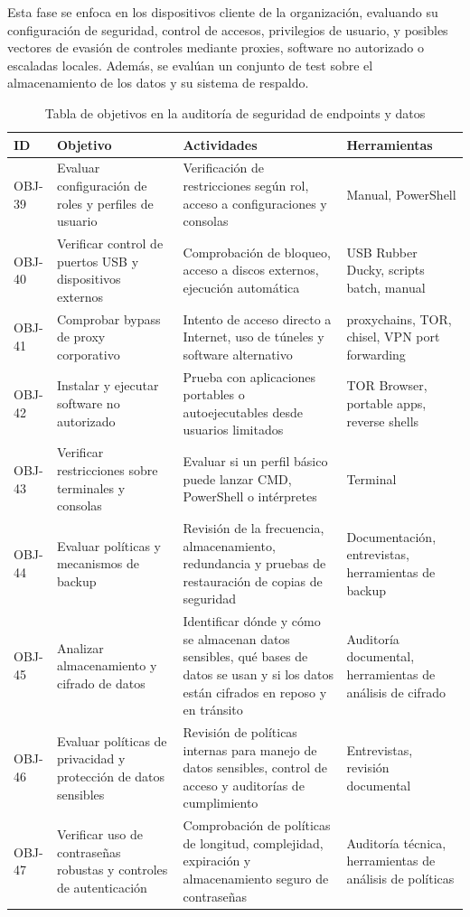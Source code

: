 \documentclass[a4paper, 11pt]{article}
\begin{document}
Esta fase se enfoca en los dispositivos cliente de la organización, evaluando su configuración de seguridad, control de accesos, privilegios de usuario, y posibles vectores de evasión de controles mediante proxies, software no autorizado o escaladas locales.
Además, se evalúan un conjunto de test sobre el almacenamiento de los datos y su sistema de respaldo.

\begin{table}[H]
\centering
\renewcommand{\arraystretch}{1.4}
\begin{tabular}{|p{1.4cm}|p{4.2cm}|p{4.8cm}|p{3.8cm}|}
\hline
\textbf{ID} & \textbf{Objetivo} & \textbf{Actividades} & \textbf{Herramientas}  \\
\hline
OBJ-39 & Evaluar configuración de roles y perfiles de usuario & Verificación de restricciones según rol, acceso a configuraciones y consolas & Manual, PowerShell  \\
\hline
OBJ-40 & Verificar control de puertos USB y dispositivos externos & Comprobación de bloqueo, acceso a discos externos, ejecución automática & USB Rubber Ducky, scripts batch, manual  \\
\hline
OBJ-41 & Comprobar bypass de proxy corporativo & Intento de acceso directo a Internet, uso de túneles y software alternativo & proxychains, TOR, chisel, VPN port forwarding  \\
\hline
OBJ-42 & Instalar y ejecutar software no autorizado & Prueba con aplicaciones portables o autoejecutables desde usuarios limitados & TOR Browser, portable apps, reverse shells  \\
\hline
OBJ-43 & Verificar restricciones sobre terminales y consolas & Evaluar si un perfil básico puede lanzar CMD, PowerShell o intérpretes & Terminal  \\
\hline
OBJ-44 & Evaluar políticas y mecanismos de backup & Revisión de la frecuencia, almacenamiento, redundancia y pruebas de restauración de copias de seguridad & Documentación, entrevistas, herramientas de backup \\
\hline
OBJ-45 & Analizar almacenamiento y cifrado de datos & Identificar dónde y cómo se almacenan datos sensibles, qué bases de datos se usan y si los datos están cifrados en reposo y en tránsito & Auditoría documental, herramientas de análisis de cifrado \\
\hline
OBJ-46 & Evaluar políticas de privacidad y protección de datos sensibles & Revisión de políticas internas para manejo de datos sensibles, control de acceso y auditorías de cumplimiento & Entrevistas, revisión documental \\
\hline
OBJ-47 & Verificar uso de contraseñas robustas y controles de autenticación & Comprobación de políticas de longitud, complejidad, expiración y almacenamiento seguro de contraseñas & Auditoría técnica, herramientas de análisis de políticas \\
\hline
\end{tabular}
\caption{Tabla de objetivos en la auditoría de seguridad de endpoints y datos}
\end{table}
\par\vspace{0.5cm}
\end{document}
